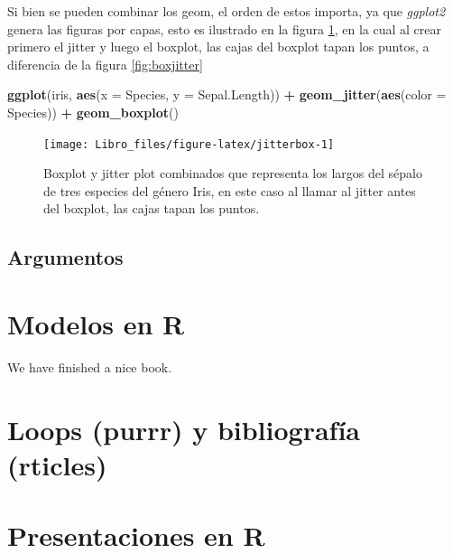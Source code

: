 \documentclass[]{book}
\newenvironment{Shaded}{\begin{snugshade}}{\end{snugshade}}
\newcommand{\DataTypeTok}[1]{\textcolor[rgb]{0.13,0.29,0.53}{#1}}
\newcommand{\KeywordTok}[1]{\textcolor[rgb]{0.13,0.29,0.53}{\textbf{#1}}}
\newcommand{\NormalTok}[1]{#1}
\newcommand{\OperatorTok}[1]{\textcolor[rgb]{0.81,0.36,0.00}{\textbf{#1}}}
\newcommand{\StringTok}[1]{\textcolor[rgb]{0.31,0.60,0.02}{#1}}
\begin{document}
Si bien se pueden combinar los geom, el orden de estos importa, ya que
\emph{ggplot2} genera las figuras por capas, esto es ilustrado en la
figura \ref{fig:jitterbox}, en la cual al crear primero el jitter y
luego el boxplot, las cajas del boxplot tapan los puntos, a diferencia
de la figura \ref{fig:boxjitter}

\begin{Shaded}
\begin{Highlighting}[]
\KeywordTok{ggplot}\NormalTok{(iris, }\KeywordTok{aes}\NormalTok{(}\DataTypeTok{x =}\NormalTok{ Species, }\DataTypeTok{y =}\NormalTok{ Sepal.Length)) }\OperatorTok{+}\StringTok{ }\KeywordTok{geom_jitter}\NormalTok{(}\KeywordTok{aes}\NormalTok{(}\DataTypeTok{color =}\NormalTok{ Species)) }\OperatorTok{+}\StringTok{ }
\StringTok{    }\KeywordTok{geom_boxplot}\NormalTok{()}
\end{Highlighting}
\end{Shaded}

\begin{figure}

{\centering \texttt{[image: Libro\_files/figure-latex/jitterbox-1]} 

}

\caption{Boxplot y jitter plot combinados que representa los largos del sépalo de tres especies del género Iris, en este caso al llamar al jitter antes del boxplot, las cajas tapan los puntos.}\label{fig:jitterbox}
\end{figure}

\hypertarget{argumentos}{%
\section{Argumentos}\label{argumentos}}

\hypertarget{modelos}{%
\chapter{Modelos en R}\label{modelos}}

We have finished a nice book.

\hypertarget{loops}{%
\chapter{Loops (purrr) y bibliografía (rticles)}\label{loops}}

\hypertarget{presentacion}{%
\chapter{Presentaciones en R}\label{presentacion}}
\end{document}
